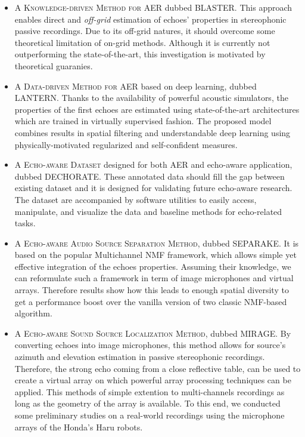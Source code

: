 \begin{itemize}

    \item A \textsc{Knowledge-driven Method for AER} dubbed \acs{BLASTER}.
    This approach enables direct and \textit{off-grid} estimation of echoes' properties in stereophonic passive recordings.
    Due to its off-grid natures, it should overcome some theoretical limitation of on-grid methods.
    Although it is currently not outperforming the state-of-the-art, this investigation is motivated by theoretical guaranies.

    \item A \textsc{Data-driven Method for AER} based on deep learning, dubbed \acs{LANTERN}.
    Thanks to the availability of powerful acoustic simulators, the properties of the first echoes are estimated using state-of-the-art architectures which are trained in virtually supervised fashion.
    The proposed model combines results in spatial filtering and understandable deep learning using physically-motivated regularized and self-confident measures.

    \item A \textsc{Echo-aware Dataset} designed for both AER and echo-aware application, dubbed \acs{DECHORATE}.
    These annotated data should fill the gap between existing dataset and it is designed for validating future echo-aware research.
    The dataset are accompanied by software utilities to easily access, manipulate, and visualize the data and baseline methods for echo-related tasks.

    \item A \textsc{Echo-aware Audio Source Separation Method}, dubbed \acs{SEPARAKE}.
    It is based on the popular Multichannel NMF framework, which allows simple yet effective integration of the echoes properties.
    Assuming their knowledge, we can reformulate such a framework in term of image microphones and virtual arrays.
    Therefore results show how this leads to enough spatial diversity to get a performance boost over the vanilla version of two classic NMF-based algorithm.

    \item A \textsc{Echo-aware Sound Source Localization Method}, dubbed \acs{MIRAGE}.
    By converting echoes into image microphones, this method allows for source's azimuth and elevation estimation in passive stereophonic recordings.
    Therefore, the strong echo coming from a close reflective table, can be used to create a virtual array on which powerful array processing techniques can be applied.
    This methods of simple extention to multi-channels recordings as long as the geometry of the array is available.
    To this end, we conducted some preliminary studies on a real-world recordings using the microphone arrays of the Honda's Haru robots.


\end{itemize}
